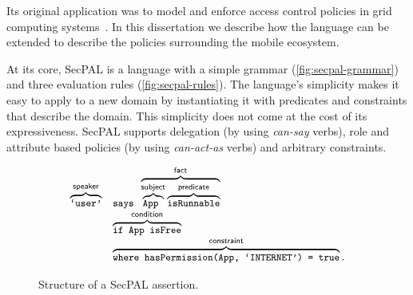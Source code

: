 \documentclass[thesis.tex]{subfiles}
\begin{document}
Its original application was to model and enforce access control
policies in grid computing systems~\cite{becker_secpal:_2010}.  In
this dissertation we describe how the language can be extended to
describe the policies surrounding the mobile ecosystem.

At its core, SecPAL is a language with a simple grammar
(\autoref{fig:secpal-grammar}) and three evaluation rules
(\autoref{fig:secpal-rules}). The language's simplicity makes it easy
to apply to a new domain by instantiating it with predicates and
constraints that describe the domain. This simplicity does not come at
the cost of its expressiveness. SecPAL supports delegation (by using
\emph{can-say} verbs), role and attribute based policies (by using
\emph{can-act-as} verbs) and arbitrary constraints.

\begin{figure}
  \newcommand{\bracetext}[1]{\text{\sffamily #1}}
  \newcommand{\smalltext}[1]{\text{\ttfamily\small #1}}
  \centering
  \begin{equation*}
    \begin{array}{r l}
      \overbrace{\smalltext{`user'}}^{\bracetext{speaker}} &
                                                             \smalltext{ says }\overbrace{\overbrace{\smalltext{ App }}^{\bracetext{subject}}\overbrace{\smalltext{ isRunnable}}^{\bracetext{predicate}}}^{\bracetext{fact}} \\
                                                           & \overbrace{\smalltext{ if App isFree}}^{\bracetext{condition}} \\
                                                           & \overbrace{\smalltext{ where hasPermission(App, `INTERNET') = true}}^{\bracetext{constraint}}.
    \end{array}
  \end{equation*}
  \caption{Structure of a SecPAL assertion.}
  \label{fig:assertion}
\end{figure}
\end{document}
